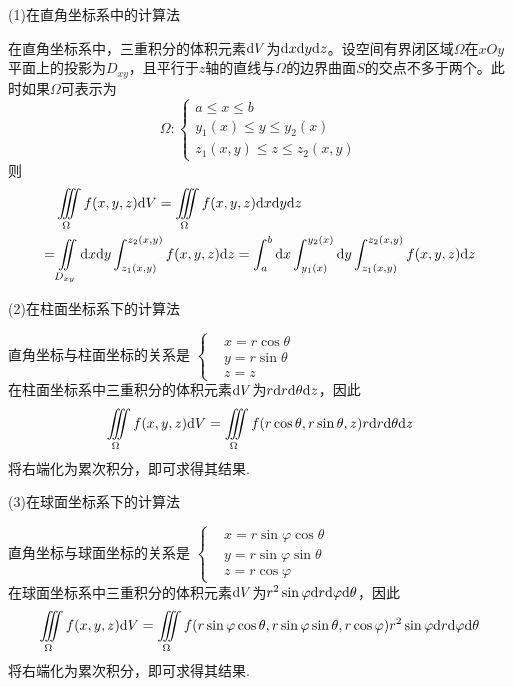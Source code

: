 (1)在直角坐标系中的计算法

在直角坐标系中，三重积分的体积元素$\mathrm{d} V$为$\mathrm{d} x\mathrm{d} y\mathrm{d} z$。设空间有界闭区域$\Omega$在$xOy$平面上的投影为$D_{xy}$，且平行于$z$轴的直线与$\Omega$的边界曲面$S$的交点不多于两个。此时如果$\Omega$可表示为
\begin{equation*}
    \Omega:
    \begin{cases}
        a \leq x \leq b \\
        y_1(x) \leq y \leq y_2(x) \\
        z_1(x,y) \leq z \leq z_2(x,y)
    \end{cases}
\end{equation*}
则
\begin{align*}
    & \iiint \limits_{\Omega} f(x,y,z)\mathrm{d} V = \iiint \limits_{\Omega} f(x,y,z)\mathrm{d} x\mathrm{d} y\mathrm{d} z \\
    = & \iint \limits_{D_{xy}}\mathrm{d} x\mathrm{d} y\int_{z_1(x,y)}^{z_2(x,y)} f(x,y,z)\mathrm{d} z = \int_{a}^{b}\mathrm{d} x \int_{y_1(x)}^{y_2(x)}\mathrm{d} y \int_{z_1(x,y)}^{z_2(x,y)} f(x,y,z)\mathrm{d} z
\end{align*}

(2)在柱面坐标系下的计算法

直角坐标与柱面坐标的关系是 \quad $\left\{\begin{aligned} & x=r\cos\theta \\ & y=r\sin\theta \\ & z=z\end{aligned}\right.$\\
在柱面坐标系中三重积分的体积元素$\mathrm{d} V$为$r\mathrm{d} r\mathrm{d}\theta\mathrm{d} z$，因此
\begin{equation*}
    \iiint \limits_{\Omega} f(x,y,z)\mathrm{d} V = \iiint \limits_{\Omega} f(r\cos\theta,r\sin\theta,z)r\mathrm{d} r\mathrm{d}\theta\mathrm{d} z
\end{equation*}
将右端化为累次积分，即可求得其结果.

(3)在球面坐标系下的计算法

直角坐标与球面坐标的关系是 \quad $\left\{\begin{aligned} & x=r\sin\varphi\cos\theta \\ & y=r\sin\varphi\sin\theta \\ & z=r\cos\varphi\end{aligned}\right.$\\
在球面坐标系中三重积分的体积元素$\mathrm{d} V$为$r^2\sin\varphi\mathrm{d} r\mathrm{d}\varphi\mathrm{d}\theta$，因此
\begin{equation*}
    \iiint \limits_{\Omega} f(x,y,z)\mathrm{d} V = \iiint \limits_{\Omega} f(r\sin\varphi\cos\theta,r\sin\varphi\sin\theta,r\cos\varphi)r^2\sin\varphi\mathrm{d} r\mathrm{d}\varphi\mathrm{d}\theta
\end{equation*}
将右端化为累次积分，即可求得其结果.

